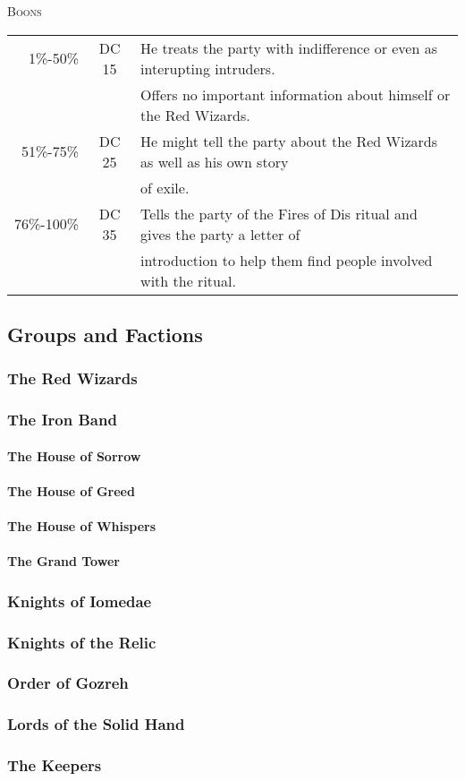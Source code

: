 		\textsc{Boons}
		\begin{tabular}{| r | c | l}
			\hline
			1\%-50\% & DC 15 & He treats the party with indifference 
						or even as interupting intruders. \\
 					& & Offers no important information about 
						himself or the Red Wizards. \\
			51\%-75\% & DC 25 & He might tell the party about the Red
						Wizards as well as his own story \\ 
					& & 	of exile. \\
			76\%-100\% & DC 35 & Tells the party of the Fires of Dis 
						ritual and gives the party a letter of \\
					& &	introduction to help them find people 
						involved with the ritual. \\ 		
			\hline
		\end{tabular}

	\subsection{Groups and Factions}

		\subsubsection{The Red Wizards}

		\subsubsection{The Iron Band}
			\paragraph{The House of Sorrow}
			\paragraph{The House of Greed}
			\paragraph{The House of Whispers}
			\paragraph{The Grand Tower}

		\subsubsection{Knights of Iomedae}

		\subsubsection{Knights of the Relic}

		\subsubsection{Order of Gozreh}

		\subsubsection{Lords of the Solid Hand}

		\subsubsection{The Keepers}


